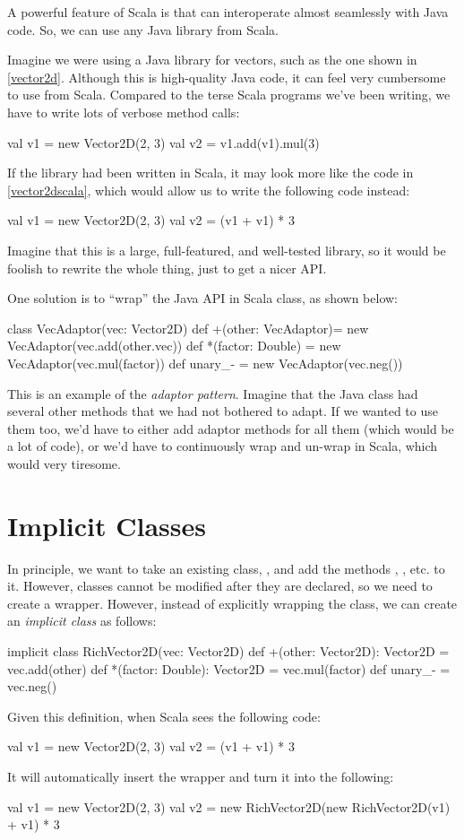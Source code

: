 \documentclass[9pt]{extbook}
\begin{document}
A powerful feature of Scala is that can interoperate almost seamlessly with
Java code. So, we can use any Java library from Scala.

Imagine we were using a Java library for vectors, such as the one shown in
\cref{vector2d}. Although this is high-quality Java code, it can feel
very cumbersome to use from Scala. Compared to the terse Scala programs
we've been writing, we have to write lots of verbose method calls:
\begin{scalacode}
val v1 = new Vector2D(2, 3)
val v2 = v1.add(v1).mul(3)
\end{scalacode}
If the library had been written in Scala, it may look more like the
code in \cref{vector2dscala}, which would allow us to write the
following code instead:
\begin{scalacode}
val v1 = new Vector2D(2, 3)
val v2 = (v1 + v1) * 3
\end{scalacode}
Imagine that this is a large, full-featured, and well-tested library, so
it would be foolish to rewrite the whole thing, just to get a nicer
API.

One solution is to ``wrap'' the Java API in Scala class, as shown below:

\begin{scalacode}
class VecAdaptor(vec: Vector2D) {
  def +(other: VecAdaptor)= new VecAdaptor(vec.add(other.vec))
  def *(factor: Double) = new VecAdaptor(vec.mul(factor))
  def unary_- = new VecAdaptor(vec.neg())
}
\end{scalacode}

This is an example of the \emph{adaptor pattern}. Imagine that
the Java class had several other methods that we had not bothered
to adapt. If we wanted to use them too, we'd have to either
add adaptor methods for all them (which would be a lot of code),
or we'd have to continuously wrap and un-wrap in Scala, which would
very tiresome.

\section{Implicit Classes}

In principle, we want to take an existing class, , and add
the methods \scalainline{+}, \scalainline{*}, etc. to  it.
 However, classes cannot be modified after they are declared, so we need to
 create a wrapper. However, instead of explicitly wrapping the class,
 we can create an \emph{implicit class} as follows:
\begin{scalacode}
implicit class RichVector2D(vec: Vector2D) {
  def +(other: Vector2D): Vector2D = vec.add(other)
  def *(factor: Double): Vector2D = vec.mul(factor)
  def unary_- = vec.neg()
}
\end{scalacode}
Given this definition, when Scala sees the following code:
\begin{scalacode}
val v1 = new Vector2D(2, 3)
val v2 = (v1 + v1) * 3
\end{scalacode}
It will automatically insert the wrapper and turn it into the following:
\begin{scalacode}
val v1 = new Vector2D(2, 3)
val v2 = new RichVector2D(new RichVector2D(v1) + v1) * 3
\end{scalacode}
\end{document}
